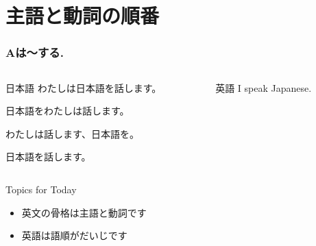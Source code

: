 \documentclass[aspectratio=169]{beamer}
\begin{document}
\section{主語と動詞の順番}
\begin{frame}[plain]\frametitle{Aは〜する.}

\begin{columns}
\begin{column}[t]{.45\textwidth}
\begin{block}{日本語}
わたしは日本語を話します。\pause

日本語をわたしは話します。\pause

わたしは話します、日本語を。\pause

日本語を話します。
\end{block}
\end{column}
\pause
\begin{column}[t]{.45\textwidth}
\begin{block}{英語}
I speak Japanese.
\end{block}
\end{column}
\end{columns}


\bigskip
\pause
\begin{exampleblock}{Topics for Today}
\begin{itemize}
 \item   英文の骨格は主語と動詞です
 \item   英語は語順がだいじです
\end{itemize}
     \end{exampleblock}
\end{frame}
\end{document}
